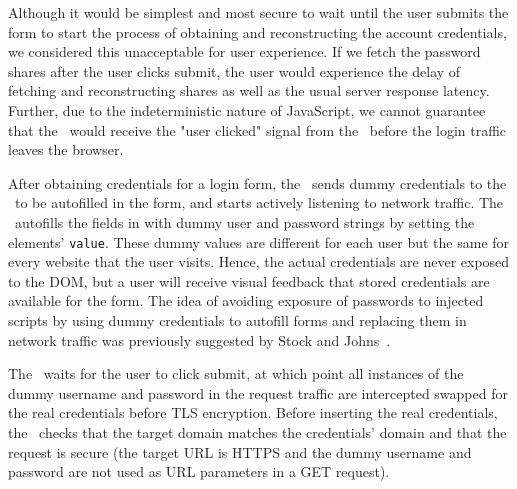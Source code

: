 Although it would be simplest and most secure to wait until the user submits the form to start the process of obtaining and reconstructing the account credentials, we considered this unacceptable for user experience. If we fetch the password shares after the user clicks submit, the user would experience the delay of fetching and reconstructing shares as well as the usual server response latency. Further, due to the indeterministic nature of JavaScript, we cannot guarantee that the \Core\ would receive the "user clicked" signal from the \UI\ before the login traffic leaves the browser.   

    
 \label{sec:swapping_credentials}
  After obtaining credentials for a login form, the \Core\ sends dummy credentials to the \UI\ to be autofilled in the form, and starts actively listening to network traffic. The \UI\ autofills the fields in with dummy user and password strings by setting the elements' {\tt{value}}. These dummy values are different for each user but the same for every website that the user visits. Hence, the actual credentials are never exposed to the DOM, but a user will receive visual feedback that stored credentials are available for the form. The idea of avoiding exposure of passwords to injected scripts by using dummy credentials to autofill forms and replacing them in network traffic was previously suggested by Stock and Johns~\cite{Stock2014}.
  
  The \Core\ waits for the user to click submit, at which point all instances of the dummy username and password in the request traffic are intercepted swapped for the real credentials before TLS encryption. Before inserting the real credentials, the \Core\ checks that the target domain matches the credentials' domain and that the request is secure (the target URL is HTTPS and the dummy username and password are not used as URL parameters in a GET request).  
  

